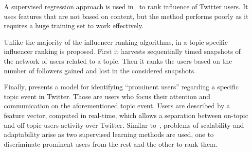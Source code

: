 A supervised regression approach is used in~\cite{7569535} to rank influence of Twitter users. It uses features that are not based on content, but the method performs poorly as it requires a huge training  set to work effectively.

	
Unlike the majority of the influencer ranking algorithms, in \cite{Schenk2011} a topic-specific influencer ranking is proposed. First it harvests sequentially timed snapshots of the network of users related to a topic. Then it ranks the users based on the number of followers gained and lost in the considered snapshots.

Finally, \cite{Bizid:2015:PUD:2808797.2809411} presents a model for identifying ``prominent users'' regarding a specific topic event in Twitter. Those are users who focus their attention and communication on the aforementioned topic event. Users are described by a feature vector, computed  in real-time, which allows a separation between on-topic and off-topic users activity over Twitter. Similar to~\cite{Biran2012}, problems of scalability and adaptability arise as two supervised learning methods are used, one to discriminate prominent users from the rest and the other to rank them.